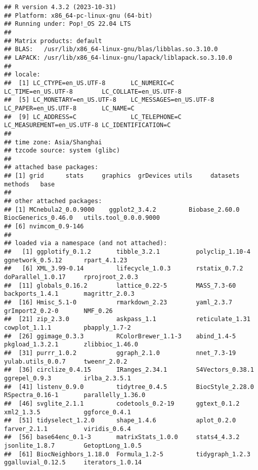 \documentclass[
]{article}
\begin{document}
\begin{verbatim}
## R version 4.3.2 (2023-10-31)
## Platform: x86_64-pc-linux-gnu (64-bit)
## Running under: Pop!_OS 22.04 LTS
## 
## Matrix products: default
## BLAS:   /usr/lib/x86_64-linux-gnu/blas/libblas.so.3.10.0 
## LAPACK: /usr/lib/x86_64-linux-gnu/lapack/liblapack.so.3.10.0
## 
## locale:
##  [1] LC_CTYPE=en_US.UTF-8       LC_NUMERIC=C               LC_TIME=en_US.UTF-8        LC_COLLATE=en_US.UTF-8    
##  [5] LC_MONETARY=en_US.UTF-8    LC_MESSAGES=en_US.UTF-8    LC_PAPER=en_US.UTF-8       LC_NAME=C                 
##  [9] LC_ADDRESS=C               LC_TELEPHONE=C             LC_MEASUREMENT=en_US.UTF-8 LC_IDENTIFICATION=C       
## 
## time zone: Asia/Shanghai
## tzcode source: system (glibc)
## 
## attached base packages:
## [1] grid      stats     graphics  grDevices utils     datasets  methods   base     
## 
## other attached packages:
## [1] MCnebula2_0.0.9000    ggplot2_3.4.2         Biobase_2.60.0        BiocGenerics_0.46.0   utils.tool_0.0.0.9000
## [6] nvimcom_0.9-146      
## 
## loaded via a namespace (and not attached):
##   [1] ggplotify_0.1.2       tibble_3.2.1          polyclip_1.10-4       ggnetwork_0.5.12      rpart_4.1.23         
##   [6] XML_3.99-0.14         lifecycle_1.0.3       rstatix_0.7.2         doParallel_1.0.17     rprojroot_2.0.3      
##  [11] globals_0.16.2        lattice_0.22-5        MASS_7.3-60           backports_1.4.1       magrittr_2.0.3       
##  [16] Hmisc_5.1-0           rmarkdown_2.23        yaml_2.3.7            grImport2_0.2-0       NMF_0.26             
##  [21] zip_2.3.0             askpass_1.1           reticulate_1.31       cowplot_1.1.1         pbapply_1.7-2        
##  [26] ggimage_0.3.3         RColorBrewer_1.1-3    abind_1.4-5           pkgload_1.3.2.1       zlibbioc_1.46.0      
##  [31] purrr_1.0.2           ggraph_2.1.0          nnet_7.3-19           yulab.utils_0.0.7     tweenr_2.0.2         
##  [36] circlize_0.4.15       IRanges_2.34.1        S4Vectors_0.38.1      ggrepel_0.9.3         irlba_2.3.5.1        
##  [41] listenv_0.9.0         tidytree_0.4.5        BiocStyle_2.28.0      RSpectra_0.16-1       parallelly_1.36.0    
##  [46] svglite_2.1.1         codetools_0.2-19      ggtext_0.1.2          xml2_1.3.5            ggforce_0.4.1        
##  [51] tidyselect_1.2.0      shape_1.4.6           aplot_0.2.0           farver_2.1.1          viridis_0.6.4        
##  [56] base64enc_0.1-3       matrixStats_1.0.0     stats4_4.3.2          jsonlite_1.8.7        GetoptLong_1.0.5     
##  [61] BiocNeighbors_1.18.0  Formula_1.2-5         tidygraph_1.2.3       ggalluvial_0.12.5     iterators_1.0.14     

\end{verbatim}
\end{document}
